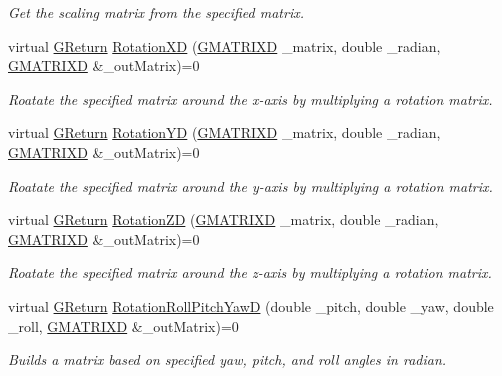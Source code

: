 \begin{DoxyCompactItemize}
\begin{DoxyCompactList}\small\item\em Get the scaling matrix from the specified matrix. \end{DoxyCompactList}\item 
virtual \hyperlink{namespaceGW_a67a839e3df7ea8a5c5686613a7a3de21}{G\+Return} \hyperlink{classGW_1_1MATH_1_1GMatrix_abb2cbb56bb2f3963807e20ba0fe591b3}{Rotation\+XD} (\hyperlink{structGW_1_1MATH_1_1GMATRIXD}{G\+M\+A\+T\+R\+I\+XD} \+\_\+matrix, double \+\_\+radian, \hyperlink{structGW_1_1MATH_1_1GMATRIXD}{G\+M\+A\+T\+R\+I\+XD} \&\+\_\+out\+Matrix)=0
\begin{DoxyCompactList}\small\item\em Roatate the specified matrix around the x-\/axis by multiplying a rotation matrix. \end{DoxyCompactList}\item 
virtual \hyperlink{namespaceGW_a67a839e3df7ea8a5c5686613a7a3de21}{G\+Return} \hyperlink{classGW_1_1MATH_1_1GMatrix_a1f836790e81a0da00ad7e9e5b06969d4}{Rotation\+YD} (\hyperlink{structGW_1_1MATH_1_1GMATRIXD}{G\+M\+A\+T\+R\+I\+XD} \+\_\+matrix, double \+\_\+radian, \hyperlink{structGW_1_1MATH_1_1GMATRIXD}{G\+M\+A\+T\+R\+I\+XD} \&\+\_\+out\+Matrix)=0
\begin{DoxyCompactList}\small\item\em Roatate the specified matrix around the y-\/axis by multiplying a rotation matrix. \end{DoxyCompactList}\item 
virtual \hyperlink{namespaceGW_a67a839e3df7ea8a5c5686613a7a3de21}{G\+Return} \hyperlink{classGW_1_1MATH_1_1GMatrix_ae219f6b6aeddcd2969e5812c8e0a481c}{Rotation\+ZD} (\hyperlink{structGW_1_1MATH_1_1GMATRIXD}{G\+M\+A\+T\+R\+I\+XD} \+\_\+matrix, double \+\_\+radian, \hyperlink{structGW_1_1MATH_1_1GMATRIXD}{G\+M\+A\+T\+R\+I\+XD} \&\+\_\+out\+Matrix)=0
\begin{DoxyCompactList}\small\item\em Roatate the specified matrix around the z-\/axis by multiplying a rotation matrix. \end{DoxyCompactList}\item 
virtual \hyperlink{namespaceGW_a67a839e3df7ea8a5c5686613a7a3de21}{G\+Return} \hyperlink{classGW_1_1MATH_1_1GMatrix_a235cf74e41b5de08159ae2e4af86d705}{Rotation\+Roll\+Pitch\+YawD} (double \+\_\+pitch, double \+\_\+yaw, double \+\_\+roll, \hyperlink{structGW_1_1MATH_1_1GMATRIXD}{G\+M\+A\+T\+R\+I\+XD} \&\+\_\+out\+Matrix)=0
\begin{DoxyCompactList}\small\item\em Builds a matrix based on specified yaw, pitch, and roll angles in radian. \end{DoxyCompactList}\item 

\end{DoxyCompactItemize}
